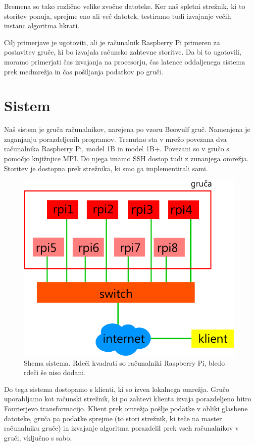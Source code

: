 Bremena so tako različno velike zvočne datoteke. Ker naš spletni strežnik, ki to storitev ponuja, sprejme eno ali več datotek, testiramo tudi izvajanje večih instanc algoritma hkrati.

Cilj primerjave je ugotoviti, ali je računalnik Raspberry Pi primeren za postavitev gruče, ki bo izvajala računsko zahtevne storitve. Da bi to ugotovili, moramo primerjati čas izvajanja na procesorju, čas latence oddaljenega sistema prek medmrežja in čas pošiljanja podatkov po gruči.

\section{Sistem}

Naš sistem je gruča računalnikov, narejena po vzoru Beowulf gruč. Namenjena je zaganjanju porazdeljenih programov. Trenutno sta v mrežo povezana dva računalnika Raspberry Pi, model 1B in model 1B+. Povezani so v gručo s pomočjo knjižnjice MPI. Do njega imamo SSH dostop tudi z zunanjega omrežja. Storitev je dostopna prek strežnika, ki smo ga implementirali sami.

\begin{figure}[H]
\centerline{\includegraphics[scale=1.5]
{shemaSistema.png}}
\caption{Shema sistema. Rdeči kvadrati so računalniki Raspberry Pi, bledo rdeči še niso dodani.}
\label{fig:gruca}
\end{figure}

Do tega sistema dostopamo s klienti, ki so izven lokalnega omrežja. Gručo uporabljamo kot računski strežnik, ki po zahtevi klienta izvaja porazdeljeno hitro Fourierjevo transformacijo. Klient prek omrežja pošlje podatke v obliki glasbene datoteke, gruča pa podatke sprejme (to stori strežnik, ki teče na master računalniku gruče) in izvajanje algoritma porazdelil prek vseh računalnikov v gruči, vključno s sabo.

